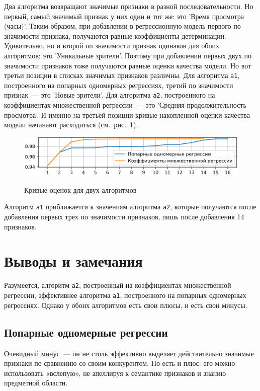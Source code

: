\documentclass[a4paper,12pt]{article}
\begin{document}
Два алгоритма возвращают значимые признаки в разной последовательности. Но первый, самый значимый  признак у них один и тот же: это 'Время просмотра (часы)'. Таким образом, при добавлении в регрессионную модель первого по значимости признака, получаются равные коэффициенты детерминации. Удивительно, но и второй по значимости признак одинаков для обоих алгоритмов: это 'Уникальные зрители'. Поэтому при добавлении первых двух по значимости признаков тоже получаются равные оценки качества модели. Но вот третьи позиции в списках значимых признаков различны. Для алгоритма \texttt{a1}, построенного на попарных одномерных регрессиях, третий по значимости признак — это 'Новые зрители'. Для алгоритма \texttt{a2}, построенного на коэффициентах множественной регрессии — это 'Средняя продолжительность просмотра'. И именно на третьей позиции кривые накопленной оценки качества модели начинают расходиться (см. рис. 1).

\begin{figure}[!h]
	\centering
	\includegraphics[width=0.8\linewidth]{pictures/Сравнение алгоритмов}
    \\
	\caption{Кривые оценок для двух алгоритмов}
\end{figure}

Алгоритм \texttt{a1} приближается к значениям алгоритма \texttt{a2}, которые получаются после добавления первых трех по значимости признаков,  лишь после добавления 14 признаков.

\section{Выводы и замечания}


Разумеется, алгоритм \texttt{a2}, построенный на коэффициентах множественной регрессии, эффективнее алгоритма \texttt{a1}, построенного на попарных одномерных регрессиях. Однако у обоих алгоритмов есть свои плюсы, и есть свои минусы.

\subsection{Попарные одномерные регрессии}

Очевидный минус — он не столь эффективно выделяет действительно значимые признаки по сравнению со своим конкурентом. Но есть и плюс: его можно использовать «вслепую», не апеллируя к семантике признаков и знанию предметной области.
\end{document}
